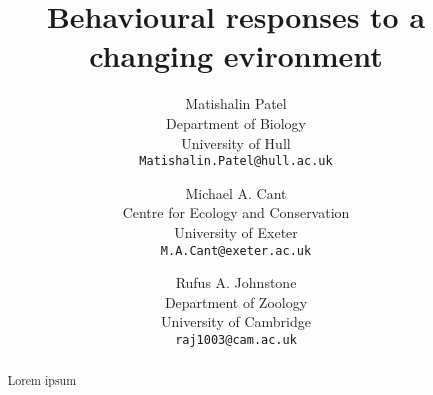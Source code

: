 \documentclass[12pt]{article}
\title{Behavioural responses to a changing evironment}
\author{
  Matishalin Patel\\
  Department of Biology \\
  University of Hull \\
  \texttt{Matishalin.Patel@hull.ac.uk} \\
  \and
  Michael A. Cant \\
  Centre for Ecology and Conservation\\
  University of Exeter \\
  \texttt{M.A.Cant@exeter.ac.uk} \\
  \and
  Rufus A. Johnstone\\
  Department of Zoology\\
  University of Cambridge \\
  \texttt{raj1003@cam.ac.uk} \\
}
\begin{document}
\maketitle

\begin{abstract}
  Lorem ipsum \cite{downing_group_2020} \parencite{bowles_did_2009}
\end{abstract}
\let\clearpage\relax






\printbibliography


\end{document}
